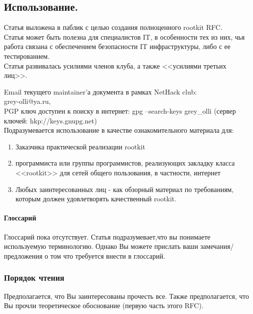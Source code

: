 \subsection{Использование.}

Статья выложена в паблик с целью создания полноценного rootkit RFC.\\

Статья может быть полезна для специалистов IT, в особенности тех из них, чья работа связана с обеспечением
безопасности IT инфраструктуры, либо с ее тестированием.\\

Статья развивалась усилиями членов клуба, а также <<усилиями третьих лиц>>.

Email текущего maintainer'а документа в рамках NetHack club:\\
grey-olli@ya.ru,\\
PGP ключ доступен к поиску в интернет: gpg --search-keys grey\_olli (сервер ключей: hkp://keys.gnupg.net)\\

Подразумевается использование в качестве ознакомительного материала для:

\begin{enumerate}
\item{Заказчика практической реализации rootkit}
\item{программиста или группы программистов, реализующих закладку класса <<rootkit>>
для сетей общего пользования, в частности, интернет}
\item{Любых заинтересованных лиц - как обзорный материал по требованиям,
 которым должен удовлетворять качественный rootkit.}
\end{enumerate}


\paragraph{Глоссарий\\}

Глоссарий пока отсутствует. Статья подразумевает,что вы понимаете используемую терминологию.
Однако Вы можете прислать ваши замечания/предложения о том что требуется внести в глоссарий.

\subsubsection{Порядок чтения}
\label{reading_notice}

Предполагается, что Вы заинтересованы прочесть все. Также предполагается, что Вы прочли теоретическое
обоснование (первую часть этого RFC).

